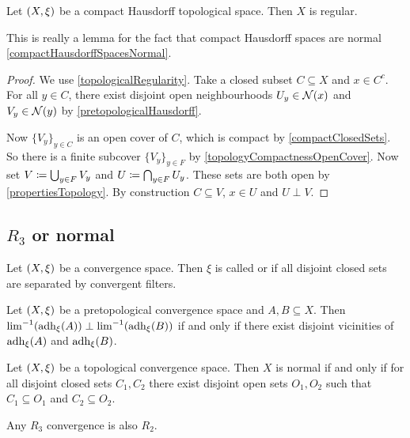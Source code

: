 \begin{lemma} \label{compactHausdorffSpacesRegular}
Let $\sSet{X,\xi}$ be a compact Hausdorff topological space. Then $X$ is regular.
\end{lemma}
This is really a lemma for the fact that compact Hausdorff spaces are normal \ref{compactHausdorffSpacesNormal}.
\begin{proof}
We use \ref{topologicalRegularity}. Take a closed subset $C\subseteq X$ and $x\in C^c$. For all $y\in C$, there exist disjoint open neighbourhoods $U_y \in \operatorname{\mathcal{N}}(x)$ and $V_y\in \operatorname{\mathcal{N}}(y)$ by \ref{pretopologicalHausdorff}.

Now $\{V_y\}_{y\in C}$ is an open cover of $C$, which is compact by \ref{compactClosedSets}. So there is a finite subcover $\{V_y\}_{y\in F}$ by \ref{topologyCompactnessOpenCover}. Now set $V \coloneqq \bigcup_{y\in F}V_y$ and $U \coloneqq \bigcap_{y\in F}U_y$. These sets are both open by \ref{propertiesTopology}. By construction $C\subseteq V$, $x\in U$ and $U\perp V$.
\end{proof}

\subsection{$R_3$ or normal}
\begin{definition}
Let $\sSet{X,\xi}$ be a convergence space. Then $\xi$ is called  or  if all disjoint closed sets are separated by convergent filters.
\end{definition}

\begin{proposition}
Let $\sSet{X,\xi}$ be a pretopological convergence space and $A,B\subseteq X$. Then $\lim^{-1}(\operatorname{adh}_\xi(A)) \perp \lim^{-1}(\operatorname{adh}_\xi(B))$ \textup{if and only if} there exist disjoint vicinities of $\operatorname{adh}_\xi(A)$ and $\operatorname{adh}_\xi(B)$.
\end{proposition}


\begin{proposition} \label{topologicalNormal}
Let $\sSet{X,\xi}$ be a topological convergence space. Then $X$ is normal \textup{if and only if} for all disjoint closed sets $C_1, C_2$ there exist disjoint open sets $O_1,O_2$ such that $C_1\subseteq O_1$ and $C_2\subseteq O_2$.
\end{proposition}

\begin{proposition}
Any $R_3$ convergence is also $R_2$.
\end{proposition}


